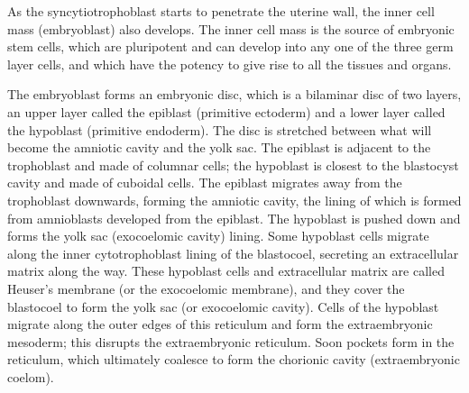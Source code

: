 As the syncytiotrophoblast starts to penetrate the uterine wall, the inner cell mass (embryoblast) also develops. The inner cell mass is the source of embryonic stem cells, which are pluripotent and can develop into any one of the three germ layer cells, and which have the potency to give rise to all the tissues and organs.

The embryoblast forms an embryonic disc, which is a bilaminar disc of two layers, an upper layer called the epiblast (primitive ectoderm) and a lower layer called the hypoblast (primitive endoderm). The disc is stretched between what will become the amniotic cavity and the yolk sac. The epiblast is adjacent to the trophoblast and made of columnar cells; the hypoblast is closest to the blastocyst cavity and made of cuboidal cells. The epiblast migrates away from the trophoblast downwards, forming the amniotic cavity, the lining of which is formed from amnioblasts developed from the epiblast. The hypoblast is pushed down and forms the yolk sac (exocoelomic cavity) lining. Some hypoblast cells migrate along the inner cytotrophoblast lining of the blastocoel, secreting an extracellular matrix along the way. These hypoblast cells and extracellular matrix are called Heuser's membrane (or the exocoelomic membrane), and they cover the blastocoel to form the yolk sac (or exocoelomic cavity). Cells of the hypoblast migrate along the outer edges of this reticulum and form the extraembryonic mesoderm; this disrupts the extraembryonic reticulum. Soon pockets form in the reticulum, which ultimately coalesce to form the chorionic cavity (extraembryonic coelom).
